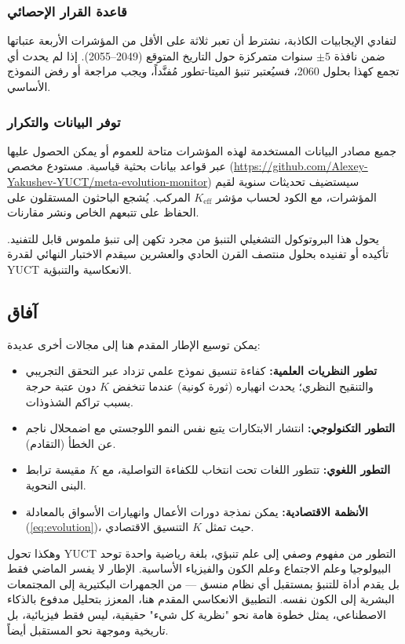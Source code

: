 \documentclass[11pt,a4paper]{article}
\begin{document}
	\subsubsection{قاعدة القرار الإحصائي}
	
	لتفادي الإيجابيات الكاذبة، نشترط أن تعبر ثلاثة على الأقل من المؤشرات الأربعة عتباتها ضمن نافذة \(\pm 5\) سنوات متمركزة حول التاريخ المتوقع (2049–2055). إذا لم يحدث أي تجمع كهذا بحلول 2060، فسيُعتبر تنبؤ الميتا-تطور مُفنَّداً، ويجب مراجعة أو رفض النموذج الأساسي.
	
	\subsubsection{توفر البيانات والتكرار}
	
	جميع مصادر البيانات المستخدمة لهذه المؤشرات متاحة للعموم أو يمكن الحصول عليها عبر قواعد بيانات بحثية قياسية. مستودع مخصص (\url{https://github.com/Alexey-Yakushev-YUCT/meta-evolution-monitor}) سيستضيف تحديثات سنوية لقيم المؤشرات، مع الكود لحساب مؤشر \(K_{\text{eff}}\) المركب. يُشجع الباحثون المستقلون على الحفاظ على تتبعهم الخاص ونشر مقارنات.
	
	يحول هذا البروتوكول التشغيلي التنبؤ من مجرد تكهن إلى تنبؤ ملموس قابل للتفنيد. تأكيده أو تفنيده بحلول منتصف القرن الحادي والعشرين سيقدم الاختبار النهائي لقدرة YUCT الانعكاسية والتنبؤية.
	
	\subsection*{آفاق}
	
	يمكن توسيع الإطار المقدم هنا إلى مجالات أخرى عديدة:
	\begin{itemize}
		\item \textbf{تطور النظريات العلمية:} كفاءة تنسيق نموذج علمي تزداد عبر التحقق التجريبي والتنقيح النظري؛ يحدث انهياره (ثورة كونية) عندما تنخفض \(K\) دون عتبة حرجة بسبب تراكم الشذوذات.
		\item \textbf{التطور التكنولوجي:} انتشار الابتكارات يتبع نفس النمو اللوجستي مع اضمحلال ناجم عن الخطأ (التقادم).
		\item \textbf{التطور اللغوي:} تتطور اللغات تحت انتخاب للكفاءة التواصلية، مع \(K\) مقيسة ترابط البنى النحوية.
		\item \textbf{الأنظمة الاقتصادية:} يمكن نمذجة دورات الأعمال وانهيارات الأسواق بالمعادلة (\ref{eq:evolution})، حيث تمثل \(K\) التنسيق الاقتصادي.
	\end{itemize}
	
	وهكذا تحول YUCT التطور من مفهوم وصفي إلى علم تنبؤي، بلغة رياضية واحدة توحد البيولوجيا وعلم الاجتماع وعلم الكون والفيزياء الأساسية. الإطار لا يفسر الماضي فقط بل يقدم أداة للتنبؤ بمستقبل أي نظام منسق — من الجمهرات البكتيرية إلى المجتمعات البشرية إلى الكون نفسه. التطبيق الانعكاسي المقدم هنا، المعزز بتحليل مدفوع بالذكاء الاصطناعي، يمثل خطوة هامة نحو "نظرية كل شيء" حقيقية، ليس فقط فيزيائية، بل تاريخية وموجهة نحو المستقبل أيضاً.
	
\end{document}
